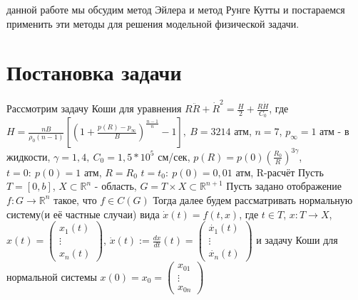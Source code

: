 \documentclass[a4paper,14pt]{article}
\begin{document}
 данной работе мы обсудим метод Эйлера и метод Рунге Кутты и постараемся применить эти методы для решения модельной физической задачи.
\section{Постановка задачи}
Рассмотрим задачу Коши для уравнения $R\ddot{R}+\dot{R}^2=\frac{H}{2}+\frac{R\dot{H}}{C_0}$, где\newline
$H=\frac{nB}{\rho_0 (n-1)}\left[\left(1+\frac{p(R)-p_{\infty}}{B}\right)^\frac{n-1}{n}-1 \right],\ B=3214$ атм, $n = 7$,\newline
$p_{\infty}=1$ атм - в жидкости, $\gamma = 1,4,\ C_0=1,5*10^5$ см/сек, $p(R)=p(0)\left(\frac{R_0}{R}\right)^{3\gamma}$,\newline
$t=0:\ p(0)=1$ атм, $R=R_0$\newline
$t=t_0:\ p(0)=0,01$ атм, R-расчёт\newline
\indent Пусть $T=[0,b]$, $X\subset \mathbb{R}^n$ - область, $G=T\times X \subset \mathbb{R}^{n+1}$\newline
Пусть задано отображение $f:G\rightarrow \mathbb{R}^n$ такое, что $f \in C(G)$\newline
Тогда далее будем рассматривать нормальную систему(и её частные случаи) вида $\dot{x}(t)=f(t,x)$, где $ t \in T$, $x:T\rightarrow X$, $x(t)=\begin{pmatrix} x_1(t) \\ \vdots \\ x_n(t)\end{pmatrix}$, $\dot{x}(t):=\frac{dx}{dt}(t)=\begin{pmatrix} \dot{x_1}(t) \\ \vdots \\ \dot{x_n}(t)\end{pmatrix}$\newline
и задачу Коши для нормальной системы $  x(0)=x_0=\begin{pmatrix} x_{01} \\ \vdots \\ x_{0n}\end{pmatrix}$\newline
\end{document}
